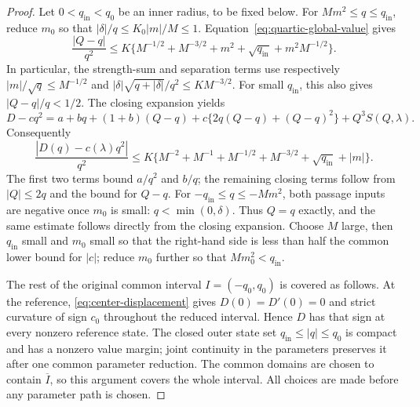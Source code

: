 \begin{proof}
Let $0<q_{\mathrm{in}}<q_0$ be an inner radius, to be fixed below.
For $Mm^2\le q\le q_{\mathrm{in}}$, reduce $m_0$ so that
$|\delta|/q\le K_0|m|/M\le1$. Equation~\eqref{eq:quartic-global-value}
gives
\[
 \frac{|Q-q|}{q^2}\le K\{M^{-1/2}+M^{-3/2}+m^2+\sqrt{q_{\mathrm{in}}}
                                      +m^2M^{-1/2}\}.
\]
In particular, the strength-sum and separation terms use respectively
$|m|/\sqrt q\le M^{-1/2}$ and
$|\delta|\sqrt{q+|\delta|}/q^2\le KM^{-3/2}$.
For small $q_{\mathrm{in}}$, this also gives $|Q-q|/q<1/2$. The closing
expansion yields
\[
 D-cq^2=a+bq+(1+b)(Q-q)
       +c\{2q(Q-q)+(Q-q)^2\}+Q^3S(Q,\lambda).
\]
Consequently
\begin{equation}\label{sat:tail-estimate}
 \frac{|D(q)-c(\lambda)q^2|}{q^2}
 \le K\{M^{-2}+M^{-1}+M^{-1/2}+M^{-3/2}
                              +\sqrt{q_{\mathrm{in}}}+|m|\}.
\end{equation}
The first two terms bound $a/q^2$ and $b/q$; the remaining closing
terms follow from $|Q|\le2q$ and the bound for $Q-q$.
For $-q_{\mathrm{in}}\le q\le-Mm^2$, both passage inputs are negative once $m_0$ is
small: $q<\min(0,\delta)$. Thus $Q=q$ exactly, and the same estimate
follows directly from the closing expansion. Choose $M$ large, then
$q_{\mathrm{in}}$ small and $m_0$ small so that the right-hand side is less than
half the common lower bound for $|c|$; reduce $m_0$ further so that
$Mm_0^2<q_{\mathrm{in}}$.

The rest of the original common interval $I=(-q_0,q_0)$ is covered as
follows. At the reference, \eqref{eq:center-displacement}
gives $D(0)=D'(0)=0$ and strict curvature of sign $c_0$ throughout
the reduced interval. Hence $D$ has that sign at every
nonzero reference state. The closed outer state set
$q_{\mathrm{in}}\le |q|\le q_0$ is compact and has a nonzero value margin; joint continuity in the
parameters preserves it after one common parameter reduction. The common domains are chosen to contain
$\overline I$, so this argument covers the whole interval.
All choices are made before any parameter path is chosen.
\end{proof}

